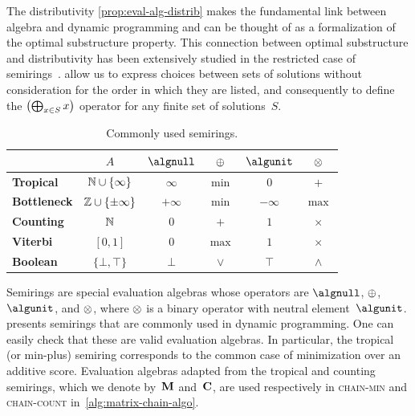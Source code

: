 The distributivity \cref{prop:eval-alg-distrib} makes the fundamental link between algebra and dynamic programming and can be thought of as a formalization of the optimal substructure property.
This connection between optimal substructure and distributivity has been extensively studied in the restricted case of semirings~\parencite{Gnesi1981DynamicProgrammingGraph,Morin1982MonotonicityPrincipleOptimality,Mohri2002SemiringFrameworksAlgorithms,Huang2008AdvancedDynamicProgramming}.
 allow us to express choices between sets of solutions without consideration for the order in which they are listed, and consequently to define the \(\left(\bigoplus_{x \in S} x\right)\) operator for any finite set of solutions~\(S\).

\begin{table}
    \capstart
    {\small
    \centering
    \setlength{\tabcolsep}{.4em}
    \begin{tabular}{lccccc}
        \toprule
        & \(A\) & \(\algnull\) & \(\mathbin{\oplus}\) & \(\algunit\) & \(\mathbin{\otimes}\) \\
        \midrule
        \textbf{Tropical} & \(\mathbb{N} \cup \{\infty\}\) & \(\infty\) & \(\min\) & \(0\) & \(+\) \\
        \midrule
        \textbf{Bottleneck} & \(\mathbb{Z} \cup \{\pm\infty\}\) & \(+\infty\) & \(\min\) & \(-\infty\) & \(\max\) \\
        \midrule
        \textbf{Counting} & \(\mathbb{N}\) & \(0\) & \(+\) & \(1\) & \(\times\) \\
        \midrule
        \textbf{Viterbi} & \([0, 1]\) & \(0\) & \(\max\) & \(1\) & \(\times\) \\
        \midrule
        \textbf{Boolean} & \(\{\bot, \top\}\) & \(\bot\) & \(\lor\) & \(\top\) & \(\land\) \\
        \bottomrule
    \end{tabular}
    \par}
    \caption[Commonly used semirings]{
        Commonly used semirings.
        \label{tab:common-algebras}
    }
\end{table}

\begin{example}[Semirings]
    Semirings are special evaluation algebras whose operators are \(\algnull\), \(\mathbin{\oplus}\), \(\algunit\), and \(\mathbin{\otimes}\), where \(\mathbin{\otimes}\) is a binary operator with neutral element~\(\algunit\).
     presents semirings that are commonly used in dynamic programming.
    One can easily check that these are valid evaluation algebras.
    In particular, the tropical (or min-plus) semiring corresponds to the common case of minimization over an additive score.
    Evaluation algebras adapted from the tropical and counting semirings, which we denote by~\(\mathbf{M}\) and~\(\mathbf{C}\), are used respectively in \textsc{chain-min} and \textsc{chain-count} in~\cref{alg:matrix-chain-algo}.
\end{example}

